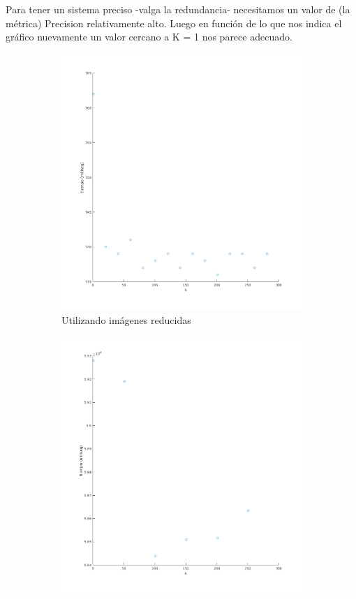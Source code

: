 Para tener un sistema preciso -valga la redundancia- necesitamos un valor de (la métrica) Precision relativamente alto. Luego en función de lo que nos indica el gráfico nuevamente un valor cercano a K = 1 nos parece adecuado.
\begin{figure}[H]
\begin{subfigure}[h]{0.62\linewidth}
\includegraphics[width=\linewidth]{img/k_knn_tiempo.png}
\caption{Utilizando imágenes reducidas}
\end{subfigure}
\hfill
\begin{subfigure}[h]{0.62\linewidth}
\includegraphics[width=\linewidth]{img/big_k_knn_tiempo.png}

\end{subfigure}
\end{figure}
